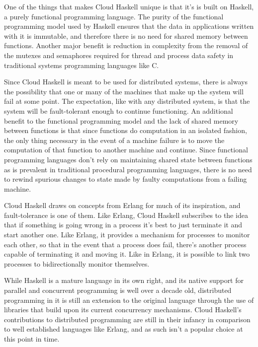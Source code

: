 \documentclass[10pt,a4paper,twocolumn]{article}
\begin{document}
One of the things that makes Cloud Haskell unique is that it's is built on
Haskell, a purely functional programming language. The purity of the functional
programming model used by Haskell ensures that the data in applications written
with it is immutable, and therefore there is no need for shared memory between
functions. Another major benefit is reduction in complexity from the removal of
the mutexes and semaphores required for thread and process data safety in
traditional systems programming languages like C.

Since Cloud Haskell is meant to be used for distributed systems, there is always
the possibility that one or many of the machines that make up the system will
fail at some point. The expectation, like with any distributed system, is that
the system will be fault-tolerant enough to continue functioning. An additional
benefit to the functional programming model and the lack of shared memory
between functions is that since functions do computation in an isolated fashion,
the only thing necessary in the event of a machine failure is to move the
computation of that function to another machine and continue. Since functional
programming languages don't rely on maintaining shared state between functions
as is prevalent in traditional procedural programming languages, there is no
need to rewind spurious changes to state made by faulty computations from a
failing machine.

Cloud Haskell draws on concepts from Erlang for much of its inspiration, and
fault-tolerance is one of them. Like Erlang, Cloud Haskell subscribes to the
idea that if something is going wrong in a process it's best to just terminate
it and start another one. Like Erlang, it provides a mechanism for processes to
monitor each other, so that in the event that a process does fail, there's
another process capable of terminating it and moving it. Like in Erlang, it is
possible to link two processes to bidirectionally monitor themselves.
\cite{cloudhaskell}

While Haskell is a mature language in its own right, and its native support for
parallel and concurrent programming is well over a decade old, distributed
programming in it is still an extension to the original language through the use
of libraries that build upon its current concurrency mechanisms. Cloud Haskell's
contributions to distributed programming are still in their infancy in
comparison to well established languages like Erlang, and as such isn't a
popular choice at this point in time.
\end{document}
